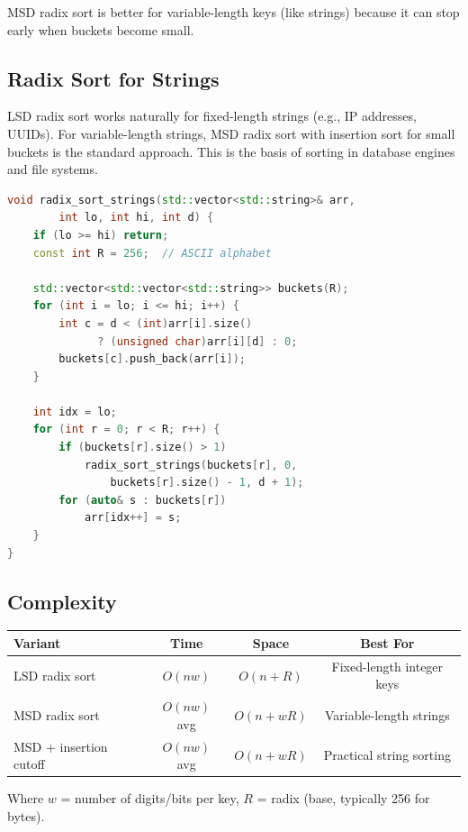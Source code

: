MSD radix sort is better for variable-length keys (like strings) because it can stop early when buckets become small.

\subsection{Radix Sort for Strings}

LSD radix sort works naturally for fixed-length strings (e.g., IP addresses, UUIDs). For variable-length strings, MSD radix sort with insertion sort for small buckets is the standard approach. This is the basis of sorting in database engines and file systems.

\begin{lstlisting}[language=C++]
void radix_sort_strings(std::vector<std::string>& arr,
        int lo, int hi, int d) {
    if (lo >= hi) return;
    const int R = 256;  // ASCII alphabet

    std::vector<std::vector<std::string>> buckets(R);
    for (int i = lo; i <= hi; i++) {
        int c = d < (int)arr[i].size()
              ? (unsigned char)arr[i][d] : 0;
        buckets[c].push_back(arr[i]);
    }

    int idx = lo;
    for (int r = 0; r < R; r++) {
        if (buckets[r].size() > 1)
            radix_sort_strings(buckets[r], 0,
                buckets[r].size() - 1, d + 1);
        for (auto& s : buckets[r])
            arr[idx++] = s;
    }
}
\end{lstlisting}

\subsection{Complexity}

\begin{center}
\begin{tabular}{lccc}
\toprule
Variant & Time & Space & Best For \\
\midrule
LSD radix sort & $O(nw)$ & $O(n + R)$ & Fixed-length integer keys \\
MSD radix sort & $O(nw)$ avg & $O(n + wR)$ & Variable-length strings \\
MSD + insertion cutoff & $O(nw)$ avg & $O(n + wR)$ & Practical string sorting \\
\bottomrule
\end{tabular}
\end{center}

Where $w$ = number of digits/bits per key, $R$ = radix (base, typically 256 for bytes).

